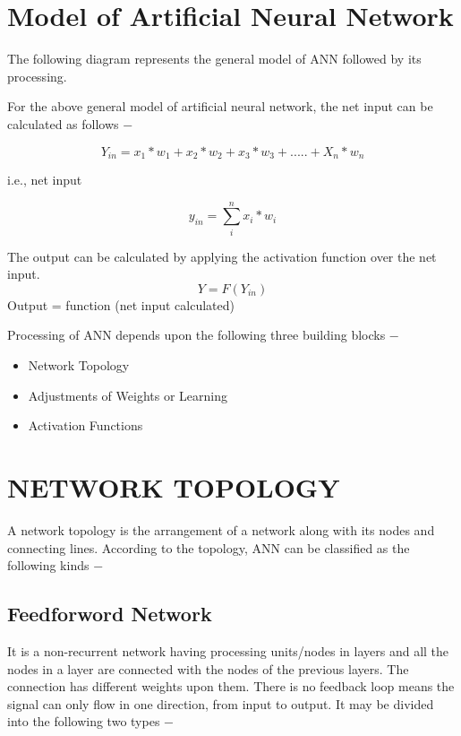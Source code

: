 \documentclass{report}
\begin{document}
\section{Model of Artificial Neural Network}
The following diagram represents the general model of ANN followed by its processing.


For the above general model of artificial neural network, the net input can be calculated as follows −

\[Y_{in} = x_{1}*w_{1} + x_{2}*w_{2} + x_{3}*w_{3} + .....+ X_{n}*w_{n}\]

i.e., net input

\[y_{in} = \sum_{i}^{n} x_{i}*w_{i}\]

The output can be calculated by applying the activation function over the net input.
\[Y = F(Y_{in})\]
Output = function (net input calculated)

Processing of ANN depends upon the following three building blocks −

\begin{itemize}
\item Network Topology
\item Adjustments of Weights or Learning
\item Activation Functions

\end{itemize}

\section{NETWORK TOPOLOGY}
A network topology is the arrangement of a network along with its nodes and connecting lines. According to the topology, ANN can be classified as the following kinds −

\subsection{Feedforword Network}
It is a non-recurrent network having processing units/nodes in layers and all the nodes in a layer are connected with the nodes of the previous layers. The connection has different weights upon them. There is no feedback loop means the signal can only flow in one direction, from input to output. It may be divided into the following two types −
\end{document}
